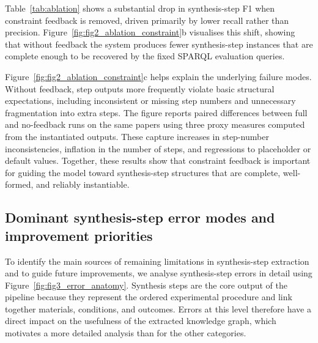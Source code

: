 Table~\ref{tab:ablation} shows a substantial drop in synthesis-step F1 when constraint feedback is removed, driven primarily by lower recall rather than precision. Figure~\ref{fig:fig2_ablation_constraint}b visualises this shift, showing that without feedback the system produces fewer synthesis-step instances that are complete enough to be recovered by the fixed SPARQL evaluation queries.

Figure~\ref{fig:fig2_ablation_constraint}c helps explain the underlying failure modes. Without feedback, step outputs more frequently violate basic structural expectations, including inconsistent or missing step numbers and unnecessary fragmentation into extra steps. The figure reports paired differences between full and no-feedback runs on the same papers using three proxy measures computed from the instantiated outputs. These capture increases in step-number inconsistencies, inflation in the number of steps, and regressions to placeholder or default values. Together, these results show that constraint feedback is important for guiding the model toward synthesis-step structures that are complete, well-formed, and reliably instantiable.



 

\subsection{Dominant synthesis-step error modes and improvement priorities}
To identify the main sources of remaining limitations in synthesis-step extraction and to guide future improvements, we analyse synthesis-step errors in detail using Figure~\ref{fig:fig3_error_anatomy}. Synthesis steps are the core output of the pipeline because they represent the ordered experimental procedure and link together materials, conditions, and outcomes. Errors at this level therefore have a direct impact on the usefulness of the extracted knowledge graph, which motivates a more detailed analysis than for the other categories.

